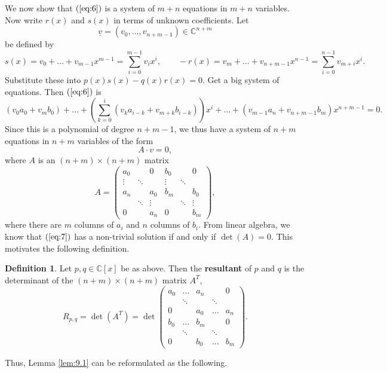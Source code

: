 \documentclass{article}
\newcommand{\C}{\mathbb{C}}
\newcommand{\rb}[1]{\left( #1 \right)}
\renewcommand{\sb}[1]{\left[ #1 \right]}
\theoremstyle{definition}\newtheorem{definition}{Definition}[section]
\theoremstyle{definition}\newtheorem{notation}[definition]{Notation}
\theoremstyle{definition}\newtheorem{remark}[definition]{Remark}
\theoremstyle{definition}\newtheorem{example1}[definition]{Example}
\theoremstyle{definition}\newtheorem{fact}{Fact}
\theoremstyle{definition}\newtheorem{exercise}{Exercise}
\theoremstyle{definition}\newtheorem*{example2}{Example}
\begin{document}
We now show that $ \rb{\ref{eq:6}} $ is a system of $ m + n $ equations in $ m + n $ variables. Now write $ r\rb{x} $ and $ s\rb{x} $ in terms of unknown coefficients. Let
$$ \underline{v} = \rb{v_0, \dots, v_{n + m - 1}} \in \C^{n + m} $$
be defined by
$$ s\rb{x} = v_0 + \dots + v_{m - 1}x^{m - 1} = \sum_{i = 0}^{m - 1} v_ix^i, \qquad -r\rb{x} = v_m + \dots + v_{n + m - 1}x^{n - 1} = \sum_{i = 0}^{n - 1} v_{m + i}x^i. $$
Substitute these into $ p\rb{x}s\rb{x} - q\rb{x}r\rb{x} = 0 $. Get a big system of equations. Then $ \rb{\ref{eq:6}} $ is
$$ \rb{v_0a_0 + v_mb_0} + \dots + \rb{\sum_{k = 0}^i \rb{v_ka_{i - k} + v_{m + k}b_{i - k}}}x^i + \dots + \rb{v_{m - 1}a_n + v_{n + m - 1}b_m}x^{n + m - 1} = 0. $$
Since this is a polynomial of degree $ n + m - 1 $, we thus have a system of $ n + m $ equations in $ n + m $ variables of the form
\begin{equation}
\label{eq:7}
A \cdot v = 0,
\end{equation}
where $ A $ is an $ \rb{n + m} \times \rb{n + m} $ matrix
$$ A = \begin{pmatrix}
a_0 & & 0 & b_0 & & 0 \\
\vdots & \ddots & & \vdots & \ddots & \\
a_n & & a_0 & b_m & & b_0 \\
& \ddots & \vdots & & \ddots & \vdots \\
0 & & a_n & 0 & & b_m
\end{pmatrix}, $$
where there are $ m $ columns of $ a_i $ and $ n $ columns of $ b_i $. From linear algebra, we know that $ \rb{\ref{eq:7}} $ has a non-trivial solution if and only if $ \det\rb{A} = 0 $. This motivates the following definition.

\begin{definition}
Let $ p, q \in \C\sb{x} $ be as above. Then the \textbf{resultant} of $ p $ and $ q $ is the determinant of the $ \rb{n + m} \times \rb{n + m} $ matrix $ A^T $,
$$ R_{p, q} = \det\rb{A^T} = \det\begin{pmatrix}
a_0 & \dots & a_n & & 0 \\
& \ddots & & \ddots & \\
0 & & a_0 & \dots & a_n \\
b_0 & \dots & b_m & & 0 \\
& \ddots & & \ddots & \\
0 & & b_0 & \dots & b_m
\end{pmatrix}. $$
\end{definition}

Thus, Lemma \ref{lem:9.1} can be reformulated as the following.
\end{document}
